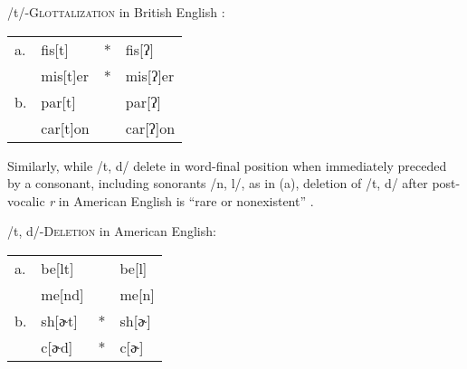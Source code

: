 \ex /t/-\textsc{Glottalization} in British English \citep[after][195, 258]{Harris1994}: \\
\begin{tabular}{l l l@{} l}
a. & fis[t]   & * & fis[ʔ]   \\
   & mis[t]er & * & mis[ʔ]er \\
b. & par[t]   &   & par[ʔ]   \\
   & car[t]on &   & car[ʔ]on \\
\end{tabular}
\xe

\noindent
Similarly, while /t, d/ delete in word-final position when immediately preceded by a consonant, including sonorants /n, l/, as in (\nextx a), deletion of /t, d/ after post-vocalic \emph{r} in American English is ``rare or nonexistent'' \citep[][8]{Guy1980}.

\ex /t, d/-\textsc{Deletion} in American English: \\
\begin{tabular}{l l l@{} l}
a. & be[lt]  &   & be[l]  \\
   & me[nd]  &   & me[n]  \\
b. & sh[ɚt]  & * & sh[ɚ] \\
   & c[ɚd]   & * & c[ɚ]  \\
\end{tabular}
\xe

